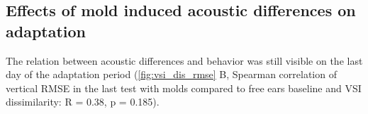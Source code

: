 \subsection{Effects of mold induced acoustic differences on adaptation}
The relation between acoustic differences and behavior was still visible on the last day of the adaptation period (\cref{fig:vsi_dis_rmse} B, Spearman correlation of vertical RMSE in the last test with molds compared to free ears baseline and VSI dissimilarity: R = 0.38, p = 0.185).  